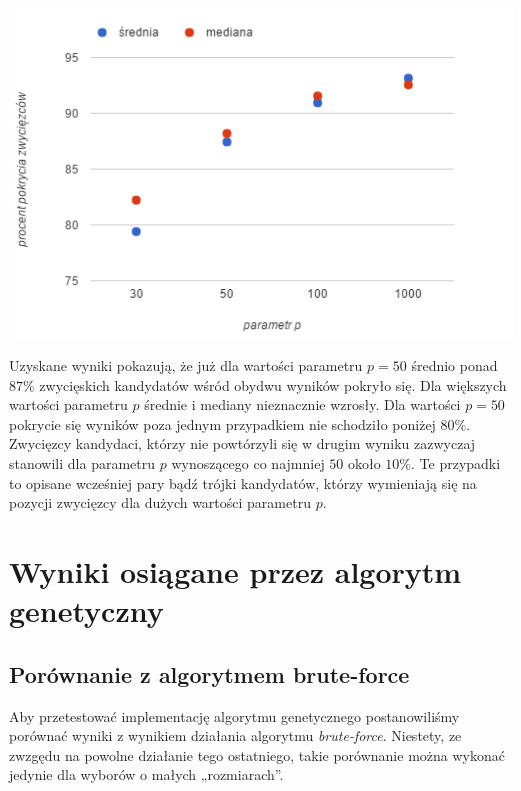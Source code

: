 \documentclass[pdflatex,11pt]{../aghdoc_version2}
\begin{document}
\vspace{\baselineskip}

\begin{center}
\centerline{\includegraphics[scale=1]{pics/srednia_mediana_od_parametr_p.png}}
\end{center}

Uzyskane wyniki pokazują, że już dla wartości parametru $p = 50$ średnio ponad $87 \%$ zwycięskich kandydatów wśród obydwu wyników pokryło się. Dla większych wartości parametru $p$ średnie i mediany nieznacznie wzrosły. Dla wartości $p = 50$ pokrycie się wyników poza jednym przypadkiem nie schodziło poniżej $80 \%$. Zwycięzcy kandydaci, którzy nie powtórzyli się w drugim wyniku zazwyczaj stanowili dla parametru $p$ wynoszącego co najmniej $50$ około $10 \%$. Te przypadki to opisane wcześniej pary bądź trójki kandydatów, którzy wymieniają się na pozycji zwycięzcy dla dużych wartości parametru $p$. 


\section{Wyniki osiągane przez algorytm genetyczny}

\subsection{Porównanie z algorytmem brute-force}

Aby przetestować implementację algorytmu genetycznego postanowiliśmy porównać wyniki z wynikiem działania algorytmu \textit{brute-force}. Niestety, ze zwzgędu na powolne działanie tego ostatniego, takie porównanie można wykonać jedynie dla wyborów o małych „rozmiarach”.
\end{document}
